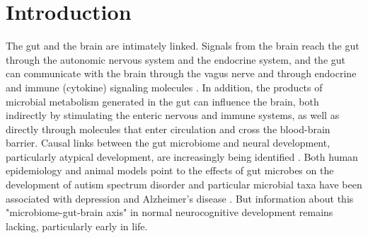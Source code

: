 \documentclass{article}
\begin{document}



\section*{Introduction}

The gut and the brain are intimately linked. Signals from the brain
reach the gut through the autonomic nervous system and the endocrine
system, and the gut can communicate with the brain through the vagus
nerve and through endocrine and immune (cytokine) signaling molecules
\cite{cerdoEarlyNutritionGut2019,pronovostPerinatalInteractionsMicrobiome2019,sharonCentralNervousSystem2016,togniniGutMicrobiotaPotential2017}.
In addition, the products of microbial metabolism generated in the gut can
influence the brain, both indirectly by stimulating the enteric nervous
and immune systems, as well as directly through molecules that enter
circulation and cross the blood-brain barrier. Causal links between the
gut microbiome and neural development, particularly atypical
development, are increasingly being identified
\cite{spichakMiningMicrobesMental2021}.
Both human epidemiology and animal models point to the effects
of gut microbes on the development of autism spectrum disorder
\cite{laueProspectiveAssociationsInfant2020,wanUnderdevelopmentGutMicrobiota2021}
and particular microbial taxa have been associated with depression
\cite{mayneris-perxachsMicrobiotaAlterationsProline2022,valles-colomerNeuroactivePotentialHuman2019}
and Alzheimer's disease
\cite{fungInteractionsMicrobiotaImmune2017,kimProbioticSupplementationImproves2021}.
But information about this "microbiome-gut-brain
axis" in normal neurocognitive development remains lacking,
particularly early in life.
\end{document}

